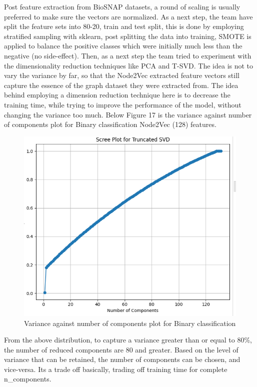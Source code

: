 \documentclass[journal,transmag]{J-NaNA}
\begin{document}
Post feature extraction from BioSNAP datasets, a round of scaling is usually preferred to make sure the vectors are normalized. As a next step, the team have split the feature sets into 80-20, train and test split, this is done by employing stratified sampling with sklearn, post splitting the data into training, SMOTE is applied to balance the positive classes which were initially much less than the negative (no side-effect). Then, as a next step the team tried to experiment with the dimensionality reduction techniques like PCA and T-SVD. The idea is not to vary the variance by far, so that the Node2Vec extracted feature vectors still capture the essence of the graph dataset they were extracted from. The idea behind employing a dimension reduction technique here is to decrease the training time, while trying to improve the performance of the model, without changing the variance too much. Below Figure 17 is the variance against number of components plot for Binary classification Node2Vec (128) features.  
\begin{figure}[htbp]
\centering
\includegraphics[width=\linewidth]{TSVD-chchse.png} 
\caption{Variance against number of components plot for Binary classification} 
\label{fig: T-SVD for binary classification} %
\end{figure}
From the above distribution, to capture a variance greater than or equal to 80\%, the number of reduced components are 80 and greater. Based on the level of variance that can be retained, the number of components can be chosen, and vice-versa. Its a trade off basically, trading off training time for complete n\_components. 
\end{document}
